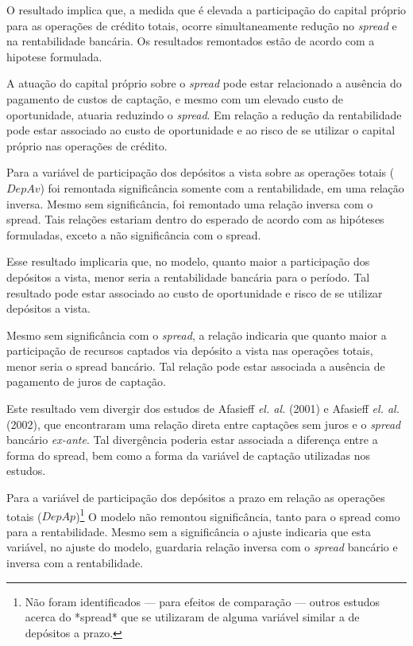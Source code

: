\documentclass[
  12pt,
  12pt,
  openright,
  oneside,
  a4paper,
  chapter=TITLE,
  section=TITLE,
  subsection=TITLE,
  subsubsection=TITLE,
  english,
  portugues,
  sumario=tradicional]{abntex2}
\begin{document}
O resultado implica que, a medida que é elevada a participação do capital próprio para as operações de crédito totais, ocorre simultaneamente redução no \emph{spread} e na rentabilidade bancária. Os resultados remontados estão de acordo com a hipotese formulada.

A atuação do capital próprio sobre o \emph{spread} pode estar relacionado a ausência do pagamento de custos de captação, e mesmo com um elevado custo de oportunidade, atuaria reduzindo o \emph{spread}. Em relação a redução da rentabilidade pode estar associado ao custo de oportunidade e ao risco de se utilizar o capital próprio nas operações de crédito.

Para a variável de participação dos depósitos a vista sobre as operações totais (\(DepAv\)) foi remontada significância somente com a rentabilidade, em uma relação inversa. Mesmo sem significância, foi remontado uma relação inversa com o spread. Tais relações estariam dentro do esperado de acordo com as hipóteses formuladas, exceto a não significância com o spread.

Esse resultado implicaria que, no modelo, quanto maior a participação dos depósitos a vista, menor seria a rentabilidade bancária para o período. Tal resultado pode estar associado ao custo de oportunidade e risco de se utilizar depósitos a vista.

Mesmo sem significância com o \emph{spread}, a relação indicaria que quanto maior a participação de recursos captados via depósito a vista nas operações totais, menor seria o spread bancário. Tal relação pode estar associada a ausência de pagamento de juros de captação.

Este resultado vem divergir dos estudos de Afasieff \emph{el. al.} (2001) e Afasieff \emph{el. al.} (2002), que encontraram uma relação direta entre captações sem juros e o \emph{spread} bancário \emph{ex-ante}. Tal divergência poderia estar associada a diferença entre a forma do spread, bem como a forma da variável de captação utilizadas nos estudos.

Para a variável de participação dos depósitos a prazo em relação as operações totais (\(DepAp\))\footnote{Não foram identificados — para efeitos de comparação — outros estudos acerca do *spread* que se utilizaram de alguma variável similar a de depósitos a prazo.} O modelo não remontou significância, tanto para o spread como para a rentabilidade. Mesmo sem a significância o ajuste indicaria que esta variável, no ajuste do modelo, guardaria relação inversa com o \emph{spread} bancário e inversa com a rentabilidade.
\end{document}
